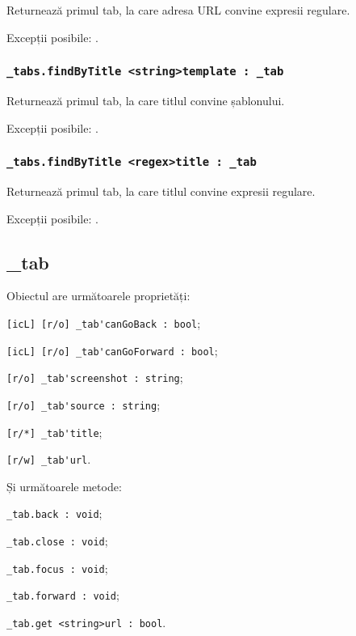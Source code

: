 Returnează primul tab, la care adresa URL convine expresii regulare.

Excepții posibile: .

\subsubsection{\lstinline|_tabs.findByTitle <string>template : _tab|}

Returnează primul tab, la care titlul convine șablonului.

Excepții posibile: .

\subsubsection{\lstinline|_tabs.findByTitle <regex>title : _tab|}

Returnează primul tab, la care titlul convine expresii regulare.

Excepții posibile: .

\subsection{{\color{orange} \_tab}}

Obiectul \tab{} are următoarele proprietăți:
\begin{icItems}
	\item \lstinline|[icL] [r/o] _tab'canGoBack : bool|;
	\item \lstinline|[icL] [r/o] _tab'canGoForward : bool|;
	\item \lstinline|[r/o] _tab'screenshot : string|;
	\item \lstinline|[r/o] _tab'source : string|;
	\item \lstinline|[r/*] _tab'title|;
	\item \lstinline|[r/w] _tab'url|.
\end{icItems}

Și următoarele metode:
\begin{icItems}
	\item \lstinline|_tab.back : void|;
	\item \lstinline|_tab.close : void|;
	\item \lstinline|_tab.focus : void|;
	\item \lstinline|_tab.forward : void|;
	\item \lstinline|_tab.get <string>url : bool|.
\end{icItems}

